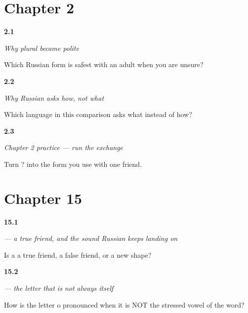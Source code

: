 \section*{Chapter 2}

\noindent\begin{minipage}[t]{\linewidth}
\raggedright
\hypertarget{review-RU-C02-vy-formality-safe-default}{\textbf{2.1}} \emph{Why plural \emph{} became polite}\par
\small Which Russian form is safest with an adult when you are unsure?
\end{minipage}\par\medskip

\noindent\begin{minipage}[t]{\linewidth}
\raggedright
\hypertarget{review-RU-C02-kak-cross-language-what-language}{\textbf{2.2}} \emph{Why Russian asks \emph{how}, not \emph{what}}\par
\small Which language in this comparison asks what instead of how?
\end{minipage}\par\medskip

\noindent\begin{minipage}[t]{\linewidth}
\raggedright
\hypertarget{review-RU-C02-practice-informal-question}{\textbf{2.3}} \emph{Chapter 2 practice — run the exchange}\par
\small Turn   ? into the form you use with one friend.
\end{minipage}\par\medskip

\section*{Chapter 15}

\noindent\begin{minipage}[t]{\linewidth}
\raggedright
\hypertarget{review-RU-W07-a-kind}{\textbf{15.1}} \emph{ — a true friend, and the sound Russian keeps landing on}\par
\small Is a a true friend, a false friend, or a new shape?
\end{minipage}\par\medskip

\noindent\begin{minipage}[t]{\linewidth}
\raggedright
\hypertarget{review-RU-W07-o-unstressed}{\textbf{15.2}} \emph{ — the letter that is not always itself}\par
\small How is the letter o pronounced when it is NOT the stressed vowel of the word?
\end{minipage}\par\medskip

